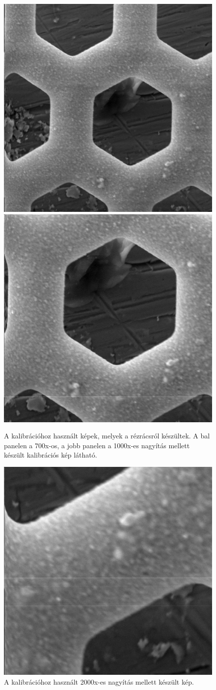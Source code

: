 \documentclass[12pt,a4paper]{article}
\begin{document}
\begin{figure}[!h]
\begin{center}
\includegraphics[width=0.45\linewidth]{E/E/010_s}
\hspace*{1cm}
\includegraphics[width=0.45\linewidth]{E/E/011_s}
\caption{A kalibrációhoz használt képek, melyek a rézrácsról készültek. A bal panelen a 700x-os, a jobb panelen a 1000x-es nagyítás mellett készült kalibrációs kép látható.}
\end{center}
\end{figure}

\begin{figure}[!h]
\centering
\includegraphics[width=0.45\linewidth]{E/E/012_s}
\caption{A kalibrációhoz használt 2000x-es nagyítás mellett készült kép.}
\end{figure}
\end{document}
